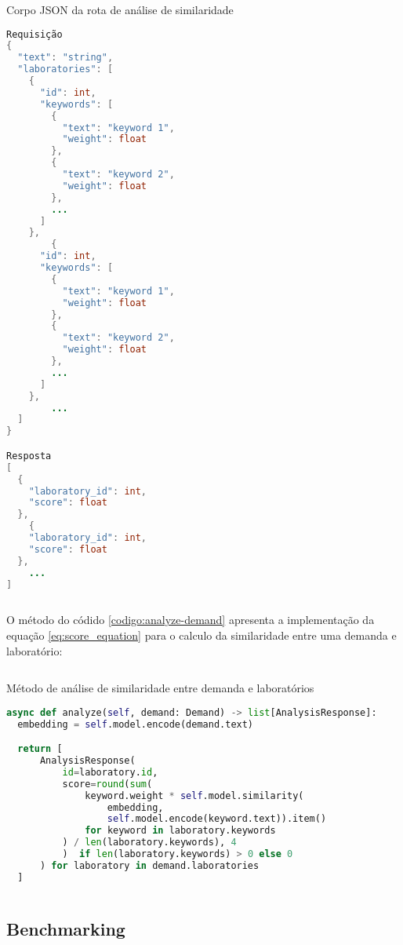 \begin{sourcecode}[H]
  \caption{\label{codigo:analyze}Corpo JSON da rota de análise de similaridade}
  \begin{lstlisting}[frame=single, language=Java]
Requisição
{
  "text": "string",
  "laboratories": [
    {
      "id": int,
      "keywords": [
        {
          "text": "keyword 1",
          "weight": float
        },
        {
          "text": "keyword 2",
          "weight": float
        },
        ...
      ]
    },
        {
      "id": int,
      "keywords": [
        {
          "text": "keyword 1",
          "weight": float
        },
        {
          "text": "keyword 2",
          "weight": float
        },
        ...
      ]
    },
        ...
  ]
}

Resposta
[
  {
    "laboratory_id": int,
    "score": float
  },
    {
    "laboratory_id": int,
    "score": float
  },
    ...
]
\end{lstlisting}
  \fonte{}
\end{sourcecode}

O método do códido \ref{codigo:analyze-demand} apresenta a implementação da equação \ref{eq:score_equation} para o calculo da similaridade entre uma demanda e laboratório:

\begin{sourcecode}[H]
  \caption{\label{codigo:analyze-demand}Método de análise de similaridade entre demanda e laboratórios}
  \begin{lstlisting}[frame=single, language=Python]
async def analyze(self, demand: Demand) -> list[AnalysisResponse]:
  embedding = self.model.encode(demand.text)

  return [
      AnalysisResponse(
          id=laboratory.id, 
          score=round(sum(
              keyword.weight * self.model.similarity(
                  embedding, 
                  self.model.encode(keyword.text)).item()
              for keyword in laboratory.keywords
          ) / len(laboratory.keywords), 4
          )  if len(laboratory.keywords) > 0 else 0
      ) for laboratory in demand.laboratories
  ]
\end{lstlisting}
  \fonte{}
\end{sourcecode}

\subsection{Benchmarking}\label{subsec:benchmarking}